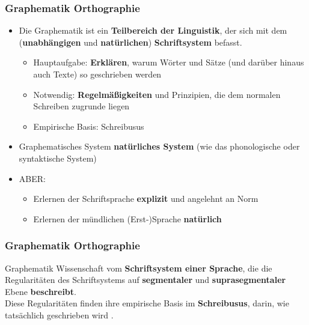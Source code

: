 \begin{frame}
\frametitle{Graphematik \vs Orthographie}

	\begin{itemize}
		\item Die Graphematik ist ein \textbf{Teilbereich der Linguistik}, der sich mit dem (\textbf{unabhängigen} und \textbf{natürlichen}) \textbf{Schriftsystem} befasst.
		
		\begin{itemize}
			\item Hauptaufgabe: \textbf{Erklären}, warum Wörter und Sätze (und darüber hinaus auch Texte) so geschrieben werden
			\item Notwendig: \textbf{Regelmäßigkeiten} und Prinzipien, die dem normalen Schreiben zugrunde liegen
			\item Empirische Basis: Schreibusus
		\end{itemize}
			
		\item Graphematisches System \ras \textbf{natürliches System} (wie das phonologische oder syntaktische System)
		\item ABER:
		
		\begin{itemize}
			\item Erlernen der Schriftsprache \ras \textbf{explizit} und angelehnt an Norm
			\item Erlernen der mündlichen (Erst-)Sprache \ras \textbf{natürlich}	
		\end{itemize}
	\end{itemize}
\end{frame}


\begin{frame}
\frametitle{Graphematik \vs Orthographie}

\begin{block}{Graphematik}
	Wissenschaft vom \textbf{Schriftsystem einer Sprache}, die die Regularitäten des
        Schriftsystems auf \textbf{segmentaler} und \textbf{suprasegmentaler} Ebene
        \textbf{beschreibt}.\\
        Diese Regularitäten finden ihre empirische Basis im \textbf{Schreibusus}, \dash darin, wie tatsächlich geschrieben wird \citep[vgl.][140]{Duerscheid04a}.
\end{block}

\end{frame}


